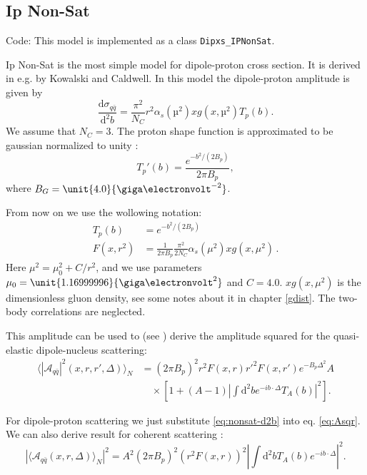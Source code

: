 \documentclass[a4paper,12pt]{article}
\newcommand{\code}[1]{\texttt{#1}}
\newcommand{\der}{\mathrm{d}}
\newcommand{\A}{\mathcal{A}}
\begin{document}
\subsection{Ip Non-Sat}
Code: This model is implemented as a class \code{Dipxs\_IPNonSat}.

Ip Non-Sat is the most simple model for dipole-proton cross section. It is derived in e.g. \cite{Caldwell:2009ke} by Kowalski and Caldwell. In this model the dipole-proton amplitude is given by
\begin{equation}
	\label{eq:nonsat-d2b}
	\frac{\der \sigma_{q\bar q}}{\der^2 b} = \frac{\pi^2}{N_C}r^2 \alpha_s(µ^2)xg(x,µ^2) T_p(b). 
\end{equation}
We assume that $N_C=3$. The proton shape function is approximated to be gaussian normalized to unity \cite{Caldwell:2009ke}:
\begin{equation}
	T_p'(b) = \frac{e^{-b^2/(2B_p)}}{2\pi B_p},
\end{equation}
where $B_G=\unit{4.0}{\giga\electronvolt^{-2}}$.

From now on we use the wollowing notation:
\begin{align}
	T_p(b) &= e^{-b^2/(2B_p)} \\
	F(x,r^2) &= \frac{1}{2\pi B_p} \frac{\pi^2}{2 N_C} \alpha_s\left(\mu^2 \right) xg\left(x, \mu^2\right) \, .
\end{align}
Here $\mu^2 = \mu_0^2 + C/r^2$, and we use parameters $\mu_0 = \unit{1.16999996}{\giga\electronvolt^2}$ and $C=4.0$. $xg(x,\mu^2)$ is the dimensionless gluon density, see some notes about it in chapter \ref{gdist}. The two-body correlations are neglected.

This amplitude can be used to (see \cite{Caldwell:2009ke}) derive the amplitude squared for the quasi-elastic dipole-nucleus scattering:
\begin{equation}
\begin{split}
	\langle|\A_{q\bar q}|^2(x,r,r',\Delta)\rangle_N &= (2\pi B_p)^2 r^2F(x,r)r'^2F(x,r') e^{-B_p \Delta^2} A  \\
	& \quad \times \left[ 1 + (A-1) \left| \int \der^2 b e^{-ib \cdot \Delta} T_A(b)\right|^2 \right] . 
\end{split}
\end{equation}

For dipole-proton scattering we just substitute \eqref{eq:nonsat-d2b} into eq. \eqref{eq:Asqr}. We can also derive result for coherent scattering \cite{Caldwell:2009ke}:
\begin{equation}
	|\langle \A_{q\bar q}(x,r,\Delta)\rangle_N|^2 = A^2 (2\pi B_p)^2 (r^2F(x,r))^2 \left| \int \der^2 b T_A(b) e^{-ib \cdot \Delta} \right|^2 .
\end{equation}
\end{document}
